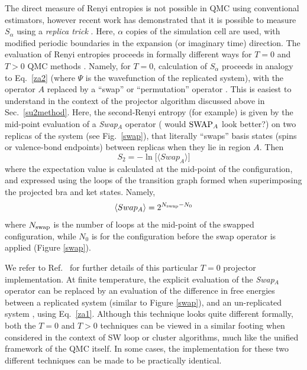 \documentclass[range]{ar2e}
\begin{document}
The direct measure of Renyi entropies is not possible in QMC using conventional estimators, however recent work has demonstrated that it is possible to 
measure $S_{\alpha}$ using a {\it replica trick} \cite{Holz,Cardy, Fradkin, BP, Naka}.  Here, $\alpha$ copies of the simulation cell are used, with modified 
periodic boundaries in the expansion (or imaginary time) direction.  The evaluation of Renyi entropies proceeds in formally different ways for $T=0$ and $T>0$ 
QMC methods \cite{Hastings10,Melko10}.  Namely, for $T=0$, calculation of $S_{\alpha}$ proceeds in analogy to Eq.~\ref{za2} (where $\Psi$ is the wavefunction 
of the replicated system), with the operator $A$ replaced by a ``swap'' \cite{Hastings10} or ``permutation'' operator \cite{Kallin11}. This is easiest to 
understand in the context of the projector algorithm discussed above in Sec.~\ref{su2method}.  Here, the second-Renyi entropy (for example) is given 
by the mid-point evaluation of a {\it Swap}$_A$ operator {(\color{red} would ${\rm SWAP}_A$ look better?)}
on two replicas of the system (see Fig.~\ref{swap}), that literally ``swaps'' basis states 
(spins or valence-bond endpoints) between replicas when they lie in region $A$.  Then
\begin{equation}
 S_2 = -\ln \Big[ \langle Swap_A \rangle \Big]
\end{equation}
 where the expectation value is calculated at the mid-point of the configuration, and expressed using the loops of the transition graph formed when 
superimposing the projected bra and ket states.  Namely,
\begin{equation}
\langle Swap_A \rangle = 2^{N_{\rm swap} - N_{0}} 
\end{equation} 
where $N_{\rm swap}$ is the number of loops at the mid-point of the swapped configuration, while $N_0$ is for the configuration before the swap operator 
is applied (Figure \ref{swap}).  

We refer to Ref.~\cite{Kallin11} for further details of this particular $T=0$ projector implementation.  At finite temperature, the explicit evaluation 
of the {\it Swap}$_A$ operator can be replaced by an evaluation of the difference in free energies between a replicated system (similar to Figure \ref{swap}), 
and an un-replicated system \cite{Melko10}, using Eq.~\ref{za1}.  Although this technique looks quite different formally, both the $T=0$ and $T>0$ techniques 
can be viewed in a similar footing when considered in the context of SW loop or cluster algorithms, much like the unified framework of the QMC itself.  
In some cases, the implementation for these two different techniques can be made to be practically identical.  
\end{document}
